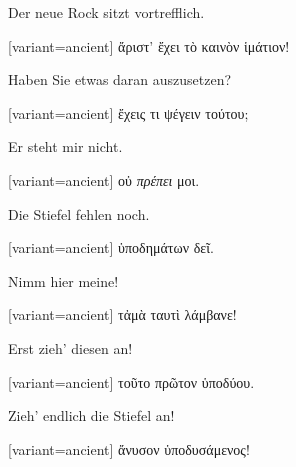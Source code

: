 Der neue Rock sitzt vortrefflich. 

\switchcolumn

\begin{greek}[variant=ancient]%
ἄριστ' ἔχει τὸ καινὸν ἱμάτιον!

\end{greek}%
\switchcolumn*

Haben Sie etwas daran aus\textcompwordmark{}zusetzen?

\switchcolumn

\begin{greek}[variant=ancient]%
ἔχεις τι ψέγειν τούτου;

\end{greek}%
\switchcolumn*

Er steht mir nicht. 

\switchcolumn

\begin{greek}[variant=ancient]%
οὐ \emph{πρέπει} μοι.

\end{greek}%
Die Stiefel fehlen noch. 

\switchcolumn

\begin{greek}[variant=ancient]%
ὑποδημάτων δεῖ.

\end{greek}%
\switchcolumn*

Nimm hier meine! 

\switchcolumn

\begin{greek}[variant=ancient]%
τἀμὰ ταυτὶ λάμβανε!

\end{greek}%
\switchcolumn*

Erst zieh' diesen an! 

\switchcolumn

\begin{greek}[variant=ancient]%
τοῦτο πρῶτον ὑποδύου.

\end{greek}%
\switchcolumn*

Zieh' endlich die Stiefel an! 

\switchcolumn

\begin{greek}[variant=ancient]%
ἄνυσον ὑποδυσάμενος!

\end{greek}%
\switchcolumn*

